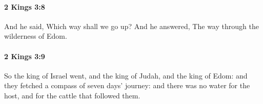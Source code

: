 		\paragraph{2 Kings 3:8} %
			\label{2KINGS-3-8}

			And he said, Which way shall we go up? And he answered, The way through the wilderness of Edom.


		\paragraph{2 Kings 3:9} %
			\label{2KINGS-3-9}

			So the king of Israel went, and the king of Judah, and the king of Edom: and they fetched a compass of seven days’ journey: and there was no water for the host, and for the cattle that followed them.


